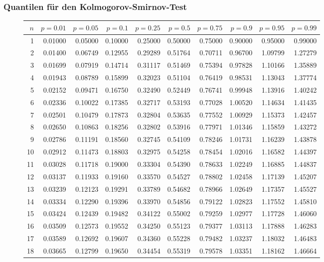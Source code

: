 \subsubsection{Quantilen für den Kolmogorov-Smirnov-Test}
\begin{figure}[h!]
\scriptsize
\begin{center}
\begin{tabular}{|r|rrr|rrr|rrr|}
\hline
$n$&$p=0.01$&$p=0.05$&$p=0.1$&$p=0.25$&$p=0.5$&$p=0.75$&$p=0.9$&$p=0.95$&$p=0.99$\\
\hline
1&0.01000&0.05000&0.10000&0.25000&0.50000&0.75000&0.90000&0.95000&0.99000\\
2&0.01400&0.06749&0.12955&0.29289&0.51764&0.70711&0.96700&1.09799&1.27279\\
3&0.01699&0.07919&0.14714&0.31117&0.51469&0.75394&0.97828&1.10166&1.35889\\
4&0.01943&0.08789&0.15899&0.32023&0.51104&0.76419&0.98531&1.13043&1.37774\\
5&0.02152&0.09471&0.16750&0.32490&0.52449&0.76741&0.99948&1.13916&1.40242\\
6&0.02336&0.10022&0.17385&0.32717&0.53193&0.77028&1.00520&1.14634&1.41435\\
7&0.02501&0.10479&0.17873&0.32804&0.53635&0.77552&1.00929&1.15373&1.42457\\
8&0.02650&0.10863&0.18256&0.32802&0.53916&0.77971&1.01346&1.15859&1.43272\\
9&0.02786&0.11191&0.18560&0.32745&0.54109&0.78246&1.01731&1.16239&1.43878\\
10&0.02912&0.11473&0.18803&0.32975&0.54258&0.78454&1.02016&1.16582&1.44397\\
11&0.03028&0.11718&0.19000&0.33304&0.54390&0.78633&1.02249&1.16885&1.44837\\
12&0.03137&0.11933&0.19160&0.33570&0.54527&0.78802&1.02458&1.17139&1.45207\\
13&0.03239&0.12123&0.19291&0.33789&0.54682&0.78966&1.02649&1.17357&1.45527\\
14&0.03334&0.12290&0.19396&0.33970&0.54856&0.79122&1.02823&1.17552&1.45810\\
15&0.03424&0.12439&0.19482&0.34122&0.55002&0.79259&1.02977&1.17728&1.46060\\
16&0.03509&0.12573&0.19552&0.34250&0.55123&0.79377&1.03113&1.17888&1.46283\\
17&0.03589&0.12692&0.19607&0.34360&0.55228&0.79482&1.03237&1.18032&1.46483\\
18&0.03665&0.12799&0.19650&0.34454&0.55319&0.79578&1.03351&1.18162&1.46664\\

\end{tabular}
\end{center}
\end{figure}

